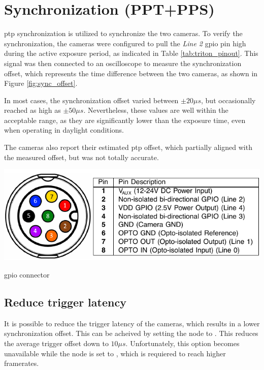 \section{Synchronization (PPT+PPS)}
\gls{ptp} synchronization is utilized to synchronize the two cameras.
To verify the synchronization, the cameras were configured to pull the \textit{Line 2} \gls{gpio} pin high during the active exposure period, as indicated in Table \ref{tab:triton_pinout}.
This signal was then connected to an oscilloscope to measure the synchronization offset, which represents the time difference between the two cameras, as shown in Figure \ref{fig:sync_offset}.

In most cases, the synchronization offset varied between $\pm20\mu s$, but occasionally reached as high as $\pm50\mu s$.
Nevertheless, these values are well within the acceptable range, as they are significantly lower than the exposure time, even when operating in daylight conditions.

The cameras also report their estimated \gls{ptp} offset, which partially aligned with the measured offset, but was not totally accurate.

\begin{table}
    \centering
    \includegraphics[width=\textwidth]{figures/triton_pinout.pdf}
    \caption{\cam \gls{gpio} connector \cite{lucidvisionlabsTritonMPPolarized2020}}
    \label{tab:triton_pinout}
\end{table}

\subsection{Reduce trigger latency}
It is possible to reduce the trigger latency of the cameras, which results in a lower synchronization offset.
This can be acheived by setting the  node to .
This reduces the average trigger offset down to $10\mu s$.
Unfortunately, this option becomes unavailable while the  node is set to , which is requiered to reach higher framerates.


